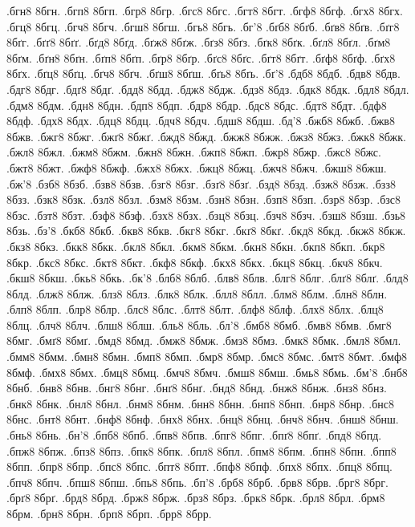{.бгн8 8бгн.
.бгп8 8бгп.
.бгр8 8бгр.
.бгс8 8бгс.
.бгт8 8бгт.
.бгф8 8бгф.
.бгх8 8бгх.
.бгц8 8бгц.
.бгч8 8бгч.
.бгш8 8бгш.
.бгь8 8бгь.
.бг'8
.бґб8 8бґб.
.бґв8 8бґв.
.бґг8 8бґг.
.бґґ8 8бґґ.
.бґд8 8бґд.
.бґж8 8бґж.
.бґз8 8бґз.
.бґк8 8бґк.
.бґл8 8бґл.
.бґм8 8бґм.
.бґн8 8бґн.
.бґп8 8бґп.
.бґр8 8бґр.
.бґс8 8бґс.
.бґт8 8бґт.
.бґф8 8бґф.
.бґх8 8бґх.
.бґц8 8бґц.
.бґч8 8бґч.
.бґш8 8бґш.
.бґь8 8бґь.
.бґ'8
.бдб8 8бдб.
.бдв8 8бдв.
.бдг8 8бдг.
.бдґ8 8бдґ.
.бдд8 8бдд.
.бдж8 8бдж.
.бдз8 8бдз.
.бдк8 8бдк.
.бдл8 8бдл.
.бдм8 8бдм.
.бдн8 8бдн.
.бдп8 8бдп.
.бдр8 8бдр.
.бдс8 8бдс.
.бдт8 8бдт.
.бдф8 8бдф.
.бдх8 8бдх.
.бдц8 8бдц.
.бдч8 8бдч.
.бдш8 8бдш.
.бд'8
.бжб8 8бжб.
.бжв8 8бжв.
.бжг8 8бжг.
.бжґ8 8бжґ.
.бжд8 8бжд.
.бжж8 8бжж.
.бжз8 8бжз.
.бжк8 8бжк.
.бжл8 8бжл.
.бжм8 8бжм.
.бжн8 8бжн.
.бжп8 8бжп.
.бжр8 8бжр.
.бжс8 8бжс.
.бжт8 8бжт.
.бжф8 8бжф.
.бжх8 8бжх.
.бжц8 8бжц.
.бжч8 8бжч.
.бжш8 8бжш.
.бж'8
.бзб8 8бзб.
.бзв8 8бзв.
.бзг8 8бзг.
.бзґ8 8бзґ.
.бзд8 8бзд.
.бзж8 8бзж.
.бзз8 8бзз.
.бзк8 8бзк.
.бзл8 8бзл.
.бзм8 8бзм.
.бзн8 8бзн.
.бзп8 8бзп.
.бзр8 8бзр.
.бзс8 8бзс.
.бзт8 8бзт.
.бзф8 8бзф.
.бзх8 8бзх.
.бзц8 8бзц.
.бзч8 8бзч.
.бзш8 8бзш.
.бзь8 8бзь.
.бз'8
.бкб8 8бкб.
.бкв8 8бкв.
.бкг8 8бкг.
.бкґ8 8бкґ.
.бкд8 8бкд.
.бкж8 8бкж.
.бкз8 8бкз.
.бкк8 8бкк.
.бкл8 8бкл.
.бкм8 8бкм.
.бкн8 8бкн.
.бкп8 8бкп.
.бкр8 8бкр.
.бкс8 8бкс.
.бкт8 8бкт.
.бкф8 8бкф.
.бкх8 8бкх.
.бкц8 8бкц.
.бкч8 8бкч.
.бкш8 8бкш.
.бкь8 8бкь.
.бк'8
.блб8 8блб.
.блв8 8блв.
.блг8 8блг.
.блґ8 8блґ.
.блд8 8блд.
.блж8 8блж.
.блз8 8блз.
.блк8 8блк.
.блл8 8блл.
.блм8 8блм.
.блн8 8блн.
.блп8 8блп.
.блр8 8блр.
.блс8 8блс.
.блт8 8блт.
.блф8 8блф.
.блх8 8блх.
.блц8 8блц.
.блч8 8блч.
.блш8 8блш.
.бль8 8бль.
.бл'8
.бмб8 8бмб.
.бмв8 8бмв.
.бмг8 8бмг.
.бмґ8 8бмґ.
.бмд8 8бмд.
.бмж8 8бмж.
.бмз8 8бмз.
.бмк8 8бмк.
.бмл8 8бмл.
.бмм8 8бмм.
.бмн8 8бмн.
.бмп8 8бмп.
.бмр8 8бмр.
.бмс8 8бмс.
.бмт8 8бмт.
.бмф8 8бмф.
.бмх8 8бмх.
.бмц8 8бмц.
.бмч8 8бмч.
.бмш8 8бмш.
.бмь8 8бмь.
.бм'8
.бнб8 8бнб.
.бнв8 8бнв.
.бнг8 8бнг.
.бнґ8 8бнґ.
.бнд8 8бнд.
.бнж8 8бнж.
.бнз8 8бнз.
.бнк8 8бнк.
.бнл8 8бнл.
.бнм8 8бнм.
.бнн8 8бнн.
.бнп8 8бнп.
.бнр8 8бнр.
.бнс8 8бнс.
.бнт8 8бнт.
.бнф8 8бнф.
.бнх8 8бнх.
.бнц8 8бнц.
.бнч8 8бнч.
.бнш8 8бнш.
.бнь8 8бнь.
.бн'8
.бпб8 8бпб.
.бпв8 8бпв.
.бпг8 8бпг.
.бпґ8 8бпґ.
.бпд8 8бпд.
.бпж8 8бпж.
.бпз8 8бпз.
.бпк8 8бпк.
.бпл8 8бпл.
.бпм8 8бпм.
.бпн8 8бпн.
.бпп8 8бпп.
.бпр8 8бпр.
.бпс8 8бпс.
.бпт8 8бпт.
.бпф8 8бпф.
.бпх8 8бпх.
.бпц8 8бпц.
.бпч8 8бпч.
.бпш8 8бпш.
.бпь8 8бпь.
.бп'8
.брб8 8брб.
.брв8 8брв.
.брг8 8брг.
.брґ8 8брґ.
.брд8 8брд.
.брж8 8брж.
.брз8 8брз.
.брк8 8брк.
.брл8 8брл.
.брм8 8брм.
.брн8 8брн.
.брп8 8брп.
.брр8 8брр.
}
